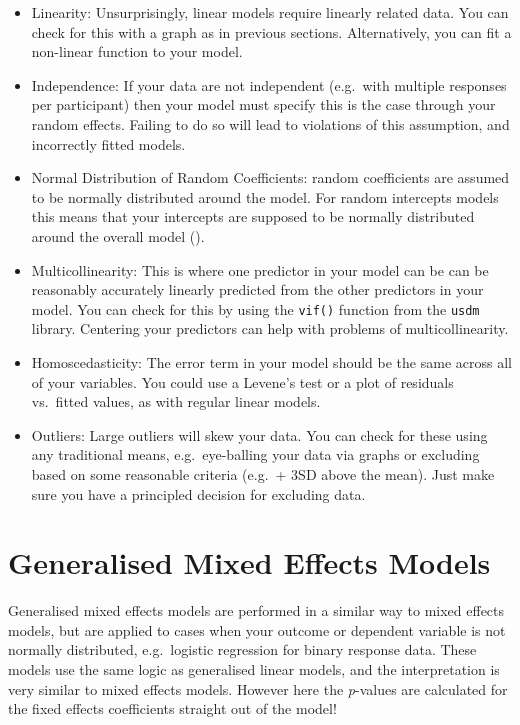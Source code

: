 \documentclass[
]{book}
\begin{document}
\begin{itemize}
\item
  Linearity: Unsurprisingly, linear models require linearly related data. You can check for this with a graph as in previous sections. Alternatively, you can fit a non-linear function to your model.
\item
  Independence: If your data are not independent (e.g.~with multiple responses per participant) then your model must specify this is the case through your random effects. Failing to do so will lead to violations of this assumption, and incorrectly fitted models.
\item
  Normal Distribution of Random Coefficients: random coefficients are assumed to be normally distributed around the model. For random intercepts models this means that your intercepts are supposed to be normally distributed around the overall model (\citet{field2012discovering}).
\item
  Multicollinearity: This is where one predictor in your model can be can be reasonably accurately linearly predicted from the other predictors in your model. You can check for this by using the \texttt{vif()} function from the \texttt{usdm} library. Centering your predictors can help with problems of multicollinearity.
\item
  Homoscedasticity: The error term in your model should be the same across all of your variables. You could use a Levene's test or a plot of residuals vs.~fitted values, as with regular linear models.
\item
  Outliers: Large outliers will skew your data. You can check for these using any traditional means, e.g.~eye-balling your data via graphs or excluding based on some reasonable criteria (e.g.~+ 3SD above the mean). Just make sure you have a principled decision for excluding data.
\end{itemize}

\hypertarget{generalised-mixed-effects-models}{%
\section{Generalised Mixed Effects Models}\label{generalised-mixed-effects-models}}

Generalised mixed effects models are performed in a similar way to mixed effects models, but are applied to cases when your outcome or dependent variable is not normally distributed, e.g.~logistic regression for binary response data. These models use the same logic as generalised linear models, and the interpretation is very similar to mixed effects models. However here the \emph{p}-values are calculated for the fixed effects coefficients straight out of the model!
\end{document}
